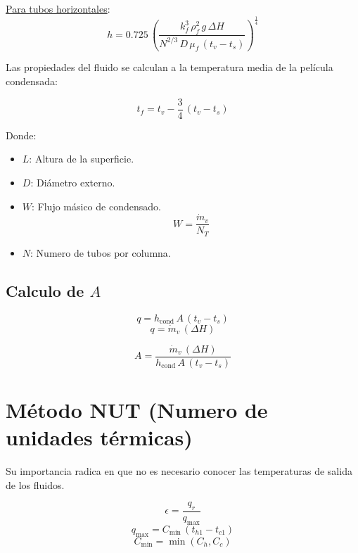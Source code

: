 \underline{Para tubos horizontales}:
\begin{equation}
    h = 0.725\,\left(\frac{k_f^3\,\rho_f^2\,g\,\Delta H}{N^{2/3}\,D\,\mu_f\,(t_v - t_s)}\right)^{\frac{1}{4}}
\end{equation}

Las propiedades del fluido se calculan a la temperatura media de la película
condensada:

\begin{equation}
    t_f = t_v - \frac{3}{4}\,(t_v - t_s)
\end{equation}

Donde:
\begin{itemize}
    \item $L$: Altura de la superficie.
    \item $D$: Diámetro externo.
    \item $W$: Flujo másico de condensado.
        \begin{equation*}
            W = \frac{\dot{m}_v}{N_T}
        \end{equation*}
    \item $N$: Numero de tubos por columna.
\end{itemize}

\subsection{Calculo de $A$}

\begin{equation*}
    q = h_{\text{cond}}\,A\,(t_v - t_s)
\end{equation*}
\begin{equation*}
    q = \dot{m}_v\,(\Delta H)
\end{equation*}

\begin{equation}
    A = \frac{\dot{m}_v\,(\Delta H)}{h_{\text{cond}}\,A\,(t_v - t_s)}
\end{equation}

\section{Método NUT (Numero de unidades térmicas)}
Su importancia radica en que no es necesario conocer las temperaturas de salida
de los fluidos.

\begin{equation}
    \epsilon = \frac{q_r}{q_{\text{max}}}
\end{equation}
\begin{equation*}
    q_{\text{max}} = C_{\text{min}}\,(t_{h1} - t_{c1})
\end{equation*}
\begin{equation*}
    C_{\text{min}} = \min(C_h, C_c)
\end{equation*}

